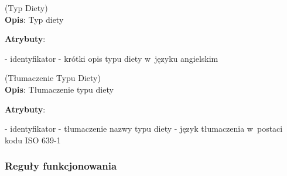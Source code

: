 \begin{enumerate}[label={\textbf{KAT/2/\protect\twodigits{\theenumi}}}, wide, labelwidth=!, labelindent=0pt, labelsep=0pt, series=reqs]
    \label{kat:DietType} (Typ Diety)\\
    \indent\textbf{Opis}: Typ diety
    \par
    \textbf{Atrybuty}:
    \begin{itemize}[series=atr, wide, align=left, leftmargin=190pt]
        \label{kat:DietType:id}- identyfikator
        \label{kat:DietType:name}- krótki opis typu diety w~języku angielskim
    \end{itemize}

    \label{kat:DietTypeTranslation} (Tłumaczenie Typu Diety)\\
    \indent\textbf{Opis}: Tłumaczenie typu diety
    \par
    \textbf{Atrybuty}:
    \begin{itemize}[series=atr, wide, align=left, leftmargin=190pt]
        \label{kat:DietTypeTranslation:id}- identyfikator
        \label{kat:DietTypeTranslation:translation}- tłumaczenie nazwy typu diety
        \label{kat:DietTypeTranslation:language}- język tłumaczenia w~postaci kodu ISO 639-1
    \end{itemize}

\end{enumerate}

\subsubsection{Reguły funkcjonowania}\label{subsubsec:database:products:functionalRules}

